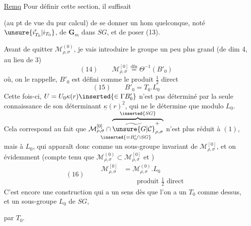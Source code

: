 \uline{Remq}\quad{}
Pour définir cette section, il suffisait



(au pt de vue du pur calcul) de se donner un hom quelconque, noté
$\unsure{i'_{T_0}|i_{T_0}}$, de $\mathbf G_m$ dans $SG$, et de poser (13).

Avant de quitter $\mathcal M_{\rho,\sigma}^{(0)}$, je vais introduire le groupe
un peu plus grand (de dim 4, au lieu de 3)
\[
(14)\qquad\mathcal M_{\rho,\sigma}^{[0]}
\overset{\mathrm{dfn}}{=}\Theta^{-1}(B'_0)
\]
où, on le rappelle, $B'_0$ est défini comme le produit $\frac12$ direct
\[
(15)\qquad B'_0=T_0.L_0
\]
Cette fois-ci, $U=U_0\kappa(r)\inserted{\in\Gamma B'_0}$ n'est pas déterminé
par la seule connaissance de son déterminant
$\underline\kappa(r)^2$, qui ne le détermine que modulo $L_0$.
Cela correspond au fait que
$\underset{\inserted{=B'_0\cap SG}}{
\mathcal M_{\rho,\sigma}^{[0]}\cap
\overbrace{\widetilde{\unsure{G|\mathcal C}}_{\rho,\sigma}^{+}}^{\inserted{SG}}}$
n'est plus réduit à $(1)$, mais à $L_0$, qui apparaît donc comme
un sous-groupe invariant de $\mathcal M_{\rho,\sigma}^{[0]}$, et on  évidemment
(compte tenu que $\mathcal M_{\rho,\sigma}^{(0)}\subset\mathcal M_{\rho,\sigma}^{[0]}$ et
) 
\[
(16)\qquad\begin{aligned}
\mathcal M_{\rho,\sigma}^{[0]}&=\mathcal M_{\rho,\sigma}^{(0)}.L_0\\
&\qquad\text{produit }\frac12\text{ direct}
\end{aligned}
\]
C'est encore une construction qui a un sens dès que l'on a un $T_0$ comme dessus,
 et un sous-groupe  $L_0$ de $SG$,



 par $T_0$. 

